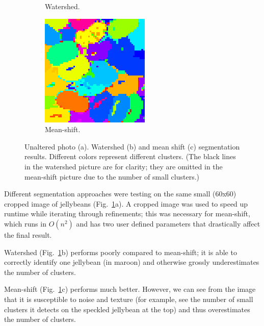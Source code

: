 \documentclass[12pt]{article}
\begin{document}
\begin{figure}
\begin{subfigure}[b]{0.3\textwidth}
      \caption{Watershed.}
  \end{subfigure}
   \begin{subfigure}[b]{0.3\textwidth}
      \includegraphics[width=\textwidth]{fig/ms3}
      \caption{Mean-shift.}
  \end{subfigure}
  \caption{Unaltered photo (a). Watershed (b) and mean shift (c) segmentation results. Different colors represent different clusters. (The black lines in the watershed picture are for clarity; they are omitted in the mean-shift picture due to the number of small clusters.)}
  \label{fig:unalt}
  \end{figure}

Different segmentation approaches were testing on the same small (60x60) cropped image of jellybeans (Fig.~\ref{fig:unalt}a). A cropped image was used to speed up runtime while iterating through refinements; this was necessary for mean-shift, which runs in \(O(n^2)\) and has two user defined parameters that drastically affect the final result.

Watershed (Fig.~\ref{fig:unalt}b) performs poorly compared to mean-shift; it is able to correctly identify one jellybean (in maroon) and otherwise grossly underestimates the number of clusters.

Mean-shift (Fig.~\ref{fig:unalt}c) performs much better. However, we can see from the image that it is susceptible to noise and texture (for example, see the number of small clusters it detects on the speckled jellybean at the top) and thus overestimates the number of clusters.
\end{document}
